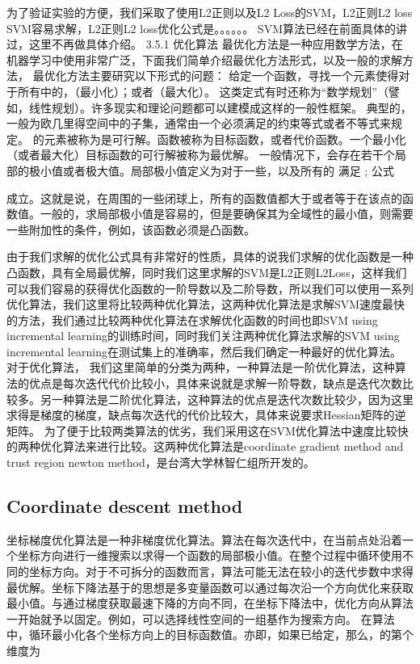 \documentclass[master]{njuthesis}
\begin{document}
为了验证实验的方便，我们采取了使用L2正则以及L2 Loss的SVM，L2正则L2 loss SVM容易求解，L2正则L2 loss优化公式是。。。。。。
SVM算法已经在前面具体的讲过，这里不再做具体介绍。
3.5.1 优化算法
最优化方法是一种应用数学方法，在机器学习中使用非常广泛，下面我们简单介绍最优化方法形式，以及一般的求解方法，
最优化方法主要研究以下形式的问题：
给定一个函数，寻找一个元素使得对于所有中的，（最小化）；或者（最大化）。
这类定式有时还称为“数学规划”（譬如，线性规划）。许多现实和理论问题都可以建模成这样的一般性框架。
典型的，一般为欧几里得空间中的子集，通常由一个必须满足的约束等式或者不等式来规定。 的元素被称为是可行解。函数被称为目标函数，或者代价函数。一个最小化（或者最大化）目标函数的可行解被称为最优解。
一般情况下，会存在若干个局部的极小值或者极大值。局部极小值定义为对于一些，以及所有的 满足
;
公式

成立。这就是说，在周围的一些闭球上，所有的函数值都大于或者等于在该点的函数值。一般的，求局部极小值是容易的，但是要确保其为全域性的最小值，则需要一些附加性的条件，例如，该函数必须是凸函数。

由于我们求解的优化公式具有非常好的性质，具体的说我们求解的优化函数是一种凸函数，具有全局最优解，同时我们这里求解的SVM是L2正则L2Loss，这样我们可以我们容易的获得优化函数的一阶导数以及二阶导数，所以我们可以使用一系列优化算法，我们这里将比较两种优化算法，这两种优化算法是求解SVM速度最快的方法，我们通过比较两种优化算法在求解优化函数的时间也即SVM using incremental learning的训练时间，同时我们关注两种优化算法求解的SVM using incremental learning在测试集上的准确率，然后我们确定一种最好的优化算法。
对于优化算法， 我们这里简单的分类为两种，一种算法是一阶优化算法，这种算法的优点是每次迭代代价比较小，具体来说就是求解一阶导数，缺点是迭代次数比较多。另一种算法是二阶优化算法，这种算法的优点是迭代次数比较少，因为这里求得是梯度的梯度，缺点每次迭代的代价比较大，具体来说要求Hessian矩阵的逆矩阵。
为了便于比较两类算法的优劣，我们采用这在SVM优化算法中速度比较快的两种优化算法来进行比较。这两种优化算法是coordinate gradient method and trust region newton method，是台湾大学林智仁组所开发的。

\subsection{Coordinate descent method}

坐标梯度优化算法是一种非梯度优化算法。算法在每次迭代中，在当前点处沿着一个坐标方向进行一维搜索以求得一个函数的局部极小值。在整个过程中循环使用不同的坐标方向。对于不可拆分的函数而言，算法可能无法在较小的迭代步数中求得最优解。坐标下降法基于的思想是多变量函数可以通过每次沿一个方向优化来获取最小值。与通过梯度获取最速下降的方向不同，在坐标下降法中，优化方向从算法一开始就予以固定。例如，可以选择线性空间的一组基作为搜索方向。 在算法中，循环最小化各个坐标方向上的目标函数值。亦即，如果已给定，那么，的第个维度为
\end{document}
